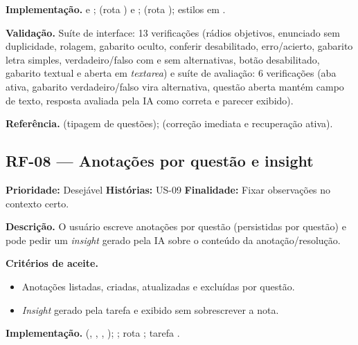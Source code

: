 \textbf{Implementação.}  e ;  (rota \texttt{}) e ;  (rota \texttt{}); estilos \texttt{} em .

\textbf{Validação.} Suíte de interface: 13 verificações (rádios objetivos, enunciado sem duplicidade, rolagem, gabarito oculto, conferir desabilitado, erro/acierto, gabarito letra simples, verdadeiro/falso com e sem alternativas, botão desabilitado, gabarito textual \texttt{} e aberta em \textit{textarea}) e suíte de avaliação: 6 verificações (aba \texttt{} ativa, gabarito verdadeiro/falso vira alternativa, questão aberta mantém campo de texto, resposta avaliada pela IA como correta e parecer exibido).

\textbf{Referência.} \cite{alshahrani_2025_qg} (tipagem de questões); \cite{roediger_karpicke_2006} (correção imediata e recuperação ativa).

\subsection{RF-08 --- Anotações por questão e insight}

\textbf{Prioridade:} Desejável \quad \textbf{Histórias:} US-09 \quad \textbf{Finalidade:} Fixar observações no contexto certo.

\textbf{Descrição.} O usuário escreve anotações por questão (persistidas por questão) e pode pedir um \emph{insight} gerado pela IA sobre o conteúdo da anotação/resolução.

\textbf{Critérios de aceite.}
\begin{itemize}
    \item Anotações listadas, criadas, atualizadas e excluídas por questão.
    \item \emph{Insight} gerado pela tarefa \texttt{} e exibido sem sobrescrever a nota.
\end{itemize}

\textbf{Implementação.}  (\texttt{}, \texttt{}, \texttt{}, \texttt{}); ; rota \texttt{}; tarefa \texttt{}.


